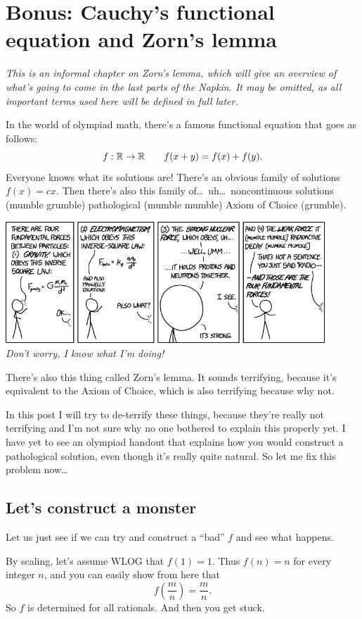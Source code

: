 \chapter{Bonus: Cauchy's functional equation and Zorn's lemma}
\label{ch:zorn}
\emph{This is an informal chapter on Zorn's lemma,
which will give an overview of what's going to come in the last parts of the Napkin.
It may be omitted, as all important terms used here will be defined in full later.}

In the world of olympiad math, there's a famous functional equation that goes as follows: 
\[ f : \mathbb R \to \mathbb R \qquad f(x+y) = f(x) + f(y). \]
Everyone knows what its solutions are!
There's an obvious family of solutions $f(x) = cx$.
Then there's also this family of\dots\ uh\dots\ noncontinuous solutions (mumble grumble) pathological 
(mumble mumble) Axiom of Choice (grumble).

\begin{center}
	\includegraphics[width=12cm]{media/xkcd-fundamental-forces.png} \\[1em]
	\emph{Don't worry, I know what I'm doing!}
\end{center}

There's also this thing called Zorn's lemma. It sounds terrifying,
because it's equivalent to the Axiom of Choice, which is also terrifying because why not.

In this post I will try to de-terrify these things,
because they're really not terrifying
and I'm not sure why no one bothered to explain this properly yet.
I have yet to see an olympiad handout that explains how you would construct
a pathological solution, even though it's really quite natural.
So let me fix this problem now\dots

\section{Let's construct a monster}
Let us just see if we can try and construct a ``bad'' $f$ and see what happens.

By scaling, let's assume WLOG that $f(1) = 1$.
Thus $f(n) = n$ for every integer $n$, and you can easily show from here that
\[ f\left( \frac mn \right) = \frac mn. \]
So $f$ is determined for all rationals. And then you get stuck.

